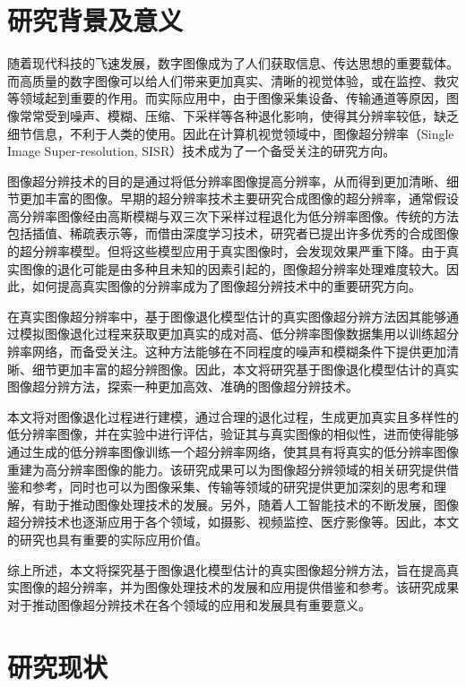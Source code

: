 \section{研究背景及意义}
随着现代科技的飞速发展，数字图像成为了人们获取信息、传达思想的重要载体。而高质量的数字图像可以给人们带来更加真实、清晰的视觉体验，或在监控、救灾等领域起到重要的作用。而实际应用中，由于图像采集设备、传输通道等原因，图像常常受到噪声、模糊、压缩、下采样等各种退化影响，使得其分辨率较低，缺乏细节信息，不利于人类的使用。因此在计算机视觉领域中，图像超分辨率（Single Image Super-resolution, SISR）技术成为了一个备受关注的研究方向。

图像超分辨技术的目的是通过将低分辨率图像提高分辨率，从而得到更加清晰、细节更加丰富的图像。早期的超分辨率技术主要研究合成图像的超分辨率，通常假设高分辨率图像经由高斯模糊与双三次下采样过程退化为低分辨率图像。传统的方法包括插值、稀疏表示等，而借由深度学习技术，研究者已提出许多优秀的合成图像的超分辨率模型。但将这些模型应用于真实图像时，会发现效果严重下降。由于真实图像的退化可能是由多种且未知的因素引起的，图像超分辨率处理难度较大。因此，如何提高真实图像的分辨率成为了图像超分辨技术中的重要研究方向。

在真实图像超分辨率中，基于图像退化模型估计的真实图像超分辨方法因其能够通过模拟图像退化过程来获取更加真实的成对高、低分辨率图像数据集用以训练超分辨率网络，而备受关注。这种方法能够在不同程度的噪声和模糊条件下提供更加清晰、细节更加丰富的超分辨图像。因此，本文将研究基于图像退化模型估计的真实图像超分辨方法，探索一种更加高效、准确的图像超分辨技术。

本文将对图像退化过程进行建模，通过合理的退化过程，生成更加真实且多样性的低分辨率图像，并在实验中进行评估，验证其与真实图像的相似性，进而使得能够通过生成的低分辨率图像训练一个超分辨率网络，使其具有将真实的低分辨率图像重建为高分辨率图像的能力。该研究成果可以为图像超分辨领域的相关研究提供借鉴和参考，同时也可以为图像采集、传输等领域的研究提供更加深刻的思考和理解，有助于推动图像处理技术的发展。另外，随着人工智能技术的不断发展，图像超分辨技术也逐渐应用于各个领域，如摄影、视频监控、医疗影像等。因此，本文的研究也具有重要的实际应用价值。

综上所述，本文将探究基于图像退化模型估计的真实图像超分辨方法，旨在提高真实图像的超分辨率，并为图像处理技术的发展和应用提供借鉴和参考。该研究成果对于推动图像超分辨技术在各个领域的应用和发展具有重要意义。
\section{研究现状}

